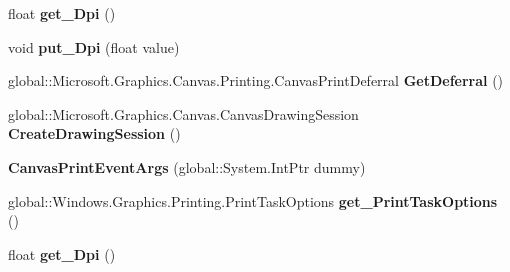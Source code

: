\begin{DoxyCompactItemize}
float {\bfseries get\+\_\+\+Dpi} ()
\item 
\mbox{\label{class_microsoft_1_1_graphics_1_1_canvas_1_1_printing_1_1_canvas_print_event_args_a5f0f1ae61467f9da31d3133fae0a7413}} 
void {\bfseries put\+\_\+\+Dpi} (float value)
\item 
\mbox{\label{class_microsoft_1_1_graphics_1_1_canvas_1_1_printing_1_1_canvas_print_event_args_a2e052fa5533258995ffc08b251a211d5}} 
global\+::\+Microsoft.\+Graphics.\+Canvas.\+Printing.\+Canvas\+Print\+Deferral {\bfseries Get\+Deferral} ()
\item 
\mbox{\label{class_microsoft_1_1_graphics_1_1_canvas_1_1_printing_1_1_canvas_print_event_args_a02bc922ffbfd6f4208853d6a3a2f0f4e}} 
global\+::\+Microsoft.\+Graphics.\+Canvas.\+Canvas\+Drawing\+Session {\bfseries Create\+Drawing\+Session} ()
\item 
\mbox{\label{class_microsoft_1_1_graphics_1_1_canvas_1_1_printing_1_1_canvas_print_event_args_ab71de59113b5cb4d0d36f0a663ad75b5}} 
{\bfseries Canvas\+Print\+Event\+Args} (global\+::\+System.\+Int\+Ptr dummy)
\item 
\mbox{\label{class_microsoft_1_1_graphics_1_1_canvas_1_1_printing_1_1_canvas_print_event_args_ad5b73bb8902c264570280b8d32de248a}} 
global\+::\+Windows.\+Graphics.\+Printing.\+Print\+Task\+Options {\bfseries get\+\_\+\+Print\+Task\+Options} ()
\item 
\mbox{\label{class_microsoft_1_1_graphics_1_1_canvas_1_1_printing_1_1_canvas_print_event_args_a489419324969512ed6bcc06da051d2b8}} 
float {\bfseries get\+\_\+\+Dpi} ()
\item 
\mbox{\label{class_microsoft_1_1_graphics_1_1_canvas_1_1_printing_1_1_canvas_print_event_args_a5f0f1ae61467f9da31d3133fae0a7413}} 

\end{DoxyCompactItemize}
